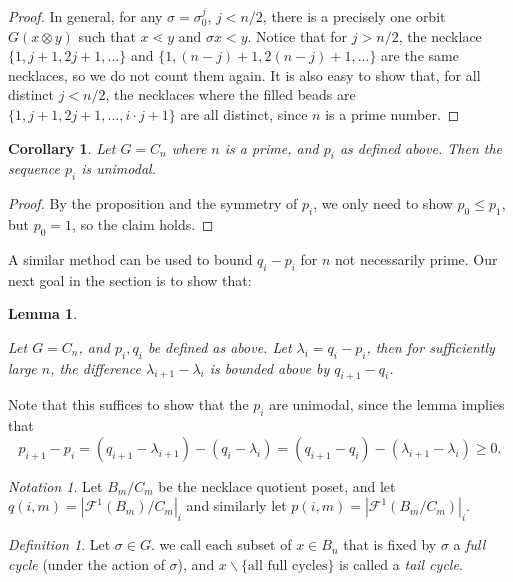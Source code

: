\documentclass{amsart}
\newtheorem{cor}[thm]{Corollary}
\newtheorem{lem}[thm]{Lemma}
\theoremstyle{remark}
\newtheorem{defn}[thm]{Definition}
\newtheorem{note}[thm]{Notation}
\newcommand{\minus}{\backslash}
\begin{document}
\begin{proof}
  
In general, for any $\sigma = \sigma_0^{j}$, $j < n/2$, there is a precisely one orbit $G(x \otimes y)$ such that $x \lessdot y$ and $\sigma x < y$.  Notice that for $j > n/2$, the necklace $\{1, j+1,2j+1, ...  \}$ and $\{1, (n-j)+1, 2(n-j)+1, ... \}$ are the same necklaces, so we do not count them again. It is also easy to show that, for all distinct $j < n/2$, the necklaces where the filled beads are $\{1, j+1, 2j+1, ..., i\cdot j+1\}$ are all distinct, since $n$ is a prime number. 
\end{proof}

\begin{cor}{\label{cor:cyclic_prime_unimodal}} Let $G = C_n$ where $n$ is a prime, and $p_i$ as defined above. Then the sequence $p_i$ is unimodal. 
\end{cor}

\begin{proof}
By the proposition and the symmetry of $p_i$, we only need to show $p_0 \le p_1$, but $p_0 = 1$, so the claim holds.
\end{proof}

A similar method can be used to bound $q_i - p_i$ for $n$ not necessarily prime.  Our next goal in the section is to show that:

\begin{lem}{\label{lem:cyclicgeneral}}

Let $G = C_n$, and $p_i, q_i$ be defined as above. Let $\lambda_i = q_i - p_i$, then for sufficiently large $n$, the difference $\lambda_{i+1} - \lambda_{i}$ is bounded above by  $q_{i+1} - q_i$. \end{lem}

Note that this suffices to show that the $p_i$ are unimodal, since the lemma implies that
$$p_{i+1} - p_{i} = (q_{i+1} - \lambda_{i+1}) - (q_i - \lambda_i) = (q_{i+1} - q_i) - (\lambda_{i+1}- \lambda_i) \ge 0.$$ 

\begin{note} Let $B_m/C_m$ be the necklace quotient poset, and let $q (i, m) = |\mathcal F^1 (B_m)/C_m|_{i}$ and similarly let $p (i, m) = |\mathcal F^1 (B_m/C_m)|_{i}$.
\end{note}

\begin{defn}
Let  $\sigma \in G.$ we call each subset of $x \in B_n$ that is fixed by $\sigma$ a \textit{full cycle} (under the action of $\sigma$), and $x \minus \{\text{all full cycles}\}$ is called a \textit{tail cycle}.  
\end{defn}
\end{document}
